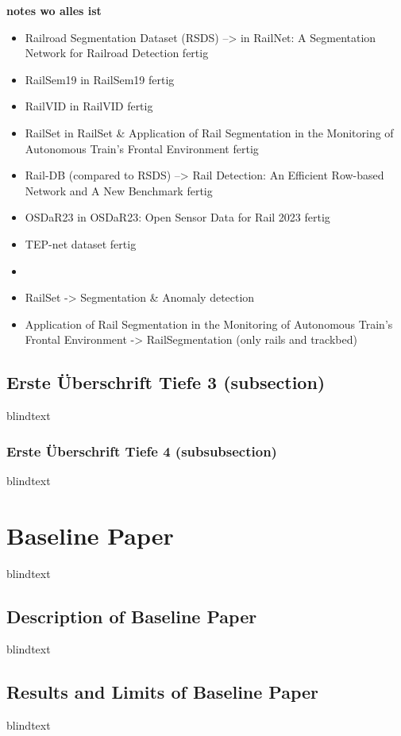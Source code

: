 \textbf{notes wo alles ist}

\begin{itemize}
    \item Railroad Segmentation Dataset (RSDS) --> in RailNet: A Segmentation Network for Railroad Detection fertig
    \item RailSem19 in RailSem19 fertig
    \item RailVID in RailVID fertig
    \item RailSet in RailSet \& Application of Rail Segmentation in the Monitoring of Autonomous Train’s Frontal Environment fertig
    \item Rail-DB (compared to RSDS) --> Rail Detection: An Efficient Row-based Network and A New Benchmark fertig
    \item OSDaR23 in OSDaR23: Open Sensor Data for Rail 2023 fertig
    \item TEP-net dataset fertig
    \item
    \item RailSet -> Segmentation \& Anomaly detection
    \item Application of Rail Segmentation in the Monitoring of Autonomous Train’s Frontal Environment -> RailSegmentation (only rails and trackbed)
\end{itemize}





\subsection{Erste Überschrift Tiefe 3 (subsection)}
blindtext

\subsubsection{Erste Überschrift Tiefe 4 (subsubsection)}
blindtext

\section{Baseline Paper}
blindtext

\subsection{Description of Baseline Paper}
blindtext

\subsection{Results and Limits of Baseline Paper}
blindtext
